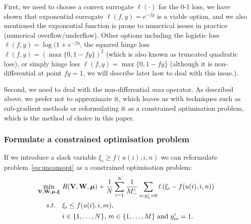 First, we need to choose a convex surrogate $\ell(\cdot)$ for the 0-1 loss,
we have shown that exponential surrogate $\ell(f, y) = e^{-fy}$ is a viable option,
and we also mentioned the exponential function is prone to numerical issues in practice (\eg numerical overflow/underflow).
Other options including the logistic loss $\ell(f, y) = \log(1 + e^{-fy}$,
the squared hinge loss $\ell(f, y) = \left( \max \{0, 1 - fy\} \right)^2$ (which is also known as truncated quadratic loss),
or simply hinge loss $\ell(f, y) = \max \{0, 1 - fy\}$ 
(although it is non-differential at point $fy = 1$, we will describe later how to deal with this issue.).

Second, we need to deal with the non-differential \emph{max} operator.
As described above, we prefer not to approximate it, 
which leaves us with techniques such as sub-gradient methods or 
reformulating it as a constrained optimisation problem, which is the method of choice in this paper.



\subsubsection{Formulate a constrained optimisation problem}
If we introduce a slack variable $\xi_i \ge f(u(i), i, n)$
we can reformulate problem~\ref{eq:unconsopt} as a constrained optimisation problem:
\begin{equation}
\label{eq:cvxopt}
\begin{aligned}
\min_{\mathbf{V}, \mathbf{W}, \bm{\mu}, \bm{\xi}} \ & R(\mathbf{V}, \mathbf{W}, \bm{\mu})
  + \frac{1}{N} \sum_{i=1}^N \frac{1}{M_-^i} \sum_{n: y_n^i = 0} \ell \left( \xi_i - f(u(i), i, n) \right) \\
s.t. \quad & 
\xi_i \le f(u(i), i, m), \\
& i \in \{1,\dots,N\}, \, m \in \{1,\dots,M\} \ \mathrm{and} \ y_m^i = 1.
\end{aligned}
\end{equation}

